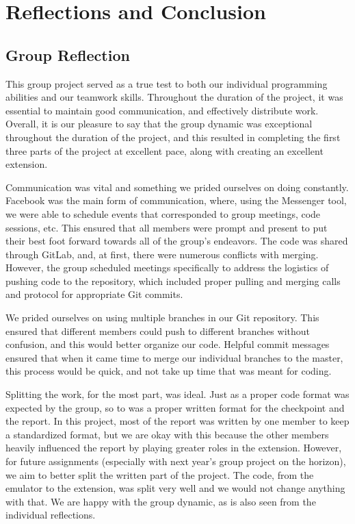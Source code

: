\documentclass[11pt]{article}
\begin{document}
\section{Reflections and Conclusion}

\subsection{Group Reflection}

This group project served as a true test to both our individual programming abilities and our teamwork skills. Throughout the duration of the project, it was essential to maintain good communication, and effectively distribute work. Overall, it is our pleasure to say that the group dynamic was exceptional throughout the duration of the project, and this resulted in completing the first three parts of the project at excellent pace, along with creating an excellent extension.

\vspace{0.2in}

Communication was vital and something we prided ourselves on doing constantly. Facebook was the main form of communication, where, using the Messenger tool, we were able to schedule events that corresponded to group meetings, code sessions, etc. This ensured that all members were prompt and present to put their best foot forward towards all of the group's endeavors. The code was shared through GitLab, and, at first, there were numerous conflicts with merging. However, the group scheduled meetings specifically to address the logistics of pushing code to the repository, which included proper pulling and merging calls and protocol for appropriate Git commits.

\vspace{0.2in}

We prided ourselves on using multiple branches in our Git repository. This ensured that different members could push to different branches without confusion, and this would better organize our code. Helpful commit messages ensured that when it came time to merge our individual branches to the master, this process would be quick, and not take up time that was meant for coding.

\vspace{0.2in}

Splitting the work, for the most part, was ideal. Just as a proper code format was expected by the group, so to was a proper written format for the checkpoint and the report. In this project, most of the report was written by one member to keep a standardized format, but we are okay with this because the other members heavily influenced the report by playing greater roles in the extension. However, for future assignments (especially with next year's group project on the horizon), we aim to better split the written part of the project. The code, from the emulator to the extension, was split very well and we would not change anything with that. We are happy with the group dynamic, as is also seen from the individual reflections.
\end{document}
